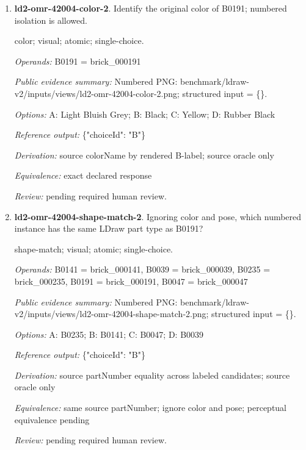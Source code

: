 \begin{enumerate}
\par{\small distance; source-data; atomic; single-choice.\par\textit{Operands:} B0233 = brick\_000233, B0035 = brick\_000035, B0116 = brick\_000116, B0171 = brick\_000171\par\textit{Public evidence summary:} \{"coordinateFrame": "Viewer world, millimeters, Euclidean distance", "centers": \{"B0035": [2, 32, 72], "B0171": [20, 57.456642, -92.888958], "B0233": [20.8, 22.3832, 119.5668], "B0116": [-18, 80, -4]\}\}\par\textit{Options:} A: B0171; B: B0116; C: B0233\par\textit{Reference output:} \{"choiceId": "C"\}\par\textit{Derivation:} Euclidean norm from public rounded centers\par\textit{Equivalence:} exact declared response\par\textit{Review:} machine checks passed; no human certification.}
\item \textbf{ld2-omr-42004-color-2}. Identify the original color of B0191; numbered isolation is allowed.
\par{\small color; visual; atomic; single-choice.\par\textit{Operands:} B0191 = brick\_000191\par\textit{Public evidence summary:} Numbered PNG: benchmark/ldraw-v2/inputs/views/ld2-omr-42004-color-2.png; structured input = \{\}.\par\textit{Options:} A: Light Bluish Grey; B: Black; C: Yellow; D: Rubber Black\par\textit{Reference output:} \{"choiceId": "B"\}\par\textit{Derivation:} source colorName by rendered B-label; source oracle only\par\textit{Equivalence:} exact declared response\par\textit{Review:} pending required human review.}
\item \textbf{ld2-omr-42004-shape-match-2}. Ignoring color and pose, which numbered instance has the same LDraw part type as B0191?
\par{\small shape-match; visual; atomic; single-choice.\par\textit{Operands:} B0141 = brick\_000141, B0039 = brick\_000039, B0235 = brick\_000235, B0191 = brick\_000191, B0047 = brick\_000047\par\textit{Public evidence summary:} Numbered PNG: benchmark/ldraw-v2/inputs/views/ld2-omr-42004-shape-match-2.png; structured input = \{\}.\par\textit{Options:} A: B0235; B: B0141; C: B0047; D: B0039\par\textit{Reference output:} \{"choiceId": "B"\}\par\textit{Derivation:} source partNumber equality across labeled candidates; source oracle only\par\textit{Equivalence:} same source partNumber; ignore color and pose; perceptual equivalence pending\par\textit{Review:} pending required human review.}

\end{enumerate}
